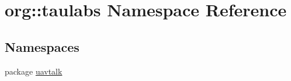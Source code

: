 \hypertarget{namespaceorg_1_1taulabs}{\section{org\-:\-:taulabs \-Namespace \-Reference}
\label{namespaceorg_1_1taulabs}
}
\subsection*{\-Namespaces}
\begin{DoxyCompactItemize}
\item 
package \hyperlink{namespaceorg_1_1taulabs_1_1uavtalk}{uavtalk}
\end{DoxyCompactItemize}
